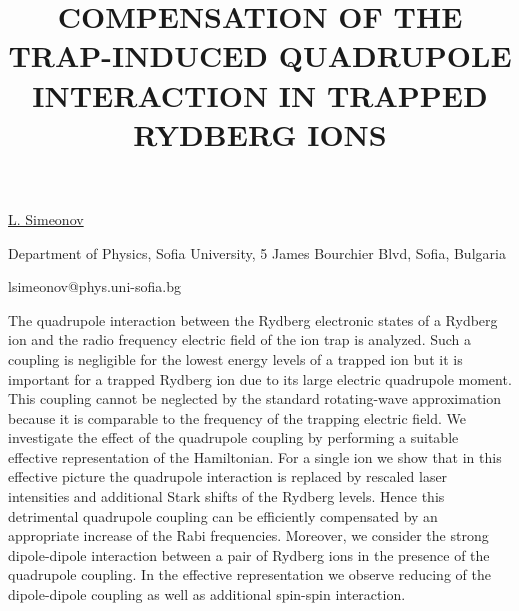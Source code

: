 \title{COMPENSATION OF THE TRAP-INDUCED QUADRUPOLE INTERACTION IN TRAPPED RYDBERG IONS}

\underline{L. Simeonov}  

{\normalsize{\vspace{-4mm}
Department of Physics, Sofia University, 5 James Bourchier Blvd, Sofia, Bulgaria



\email lsimeonov@phys.uni-sofia.bg}}

The quadrupole interaction between the Rydberg electronic states of a Rydberg ion and the radio
frequency electric field of the ion trap is analyzed. Such a coupling is negligible for the lowest energy
levels of a trapped ion but it is important for a trapped Rydberg ion due to its large electric quadrupole
moment. This coupling cannot be neglected by the standard rotating-wave approximation because it is
comparable to the frequency of the trapping electric field. We investigate the effect of the quadrupole
coupling by performing a suitable effective representation of the Hamiltonian. For a single ion we
show that in this effective picture the quadrupole interaction is replaced by rescaled laser intensities
and additional Stark shifts of the Rydberg levels. Hence this detrimental quadrupole coupling can be
efficiently compensated by an appropriate increase of the Rabi frequencies. Moreover, we consider
the strong dipole-dipole interaction between a pair of Rydberg ions in the presence of the quadrupole
coupling. In the effective representation we observe reducing of the dipole-dipole coupling as well as
additional spin-spin interaction.

\vspace{\baselineskip}
